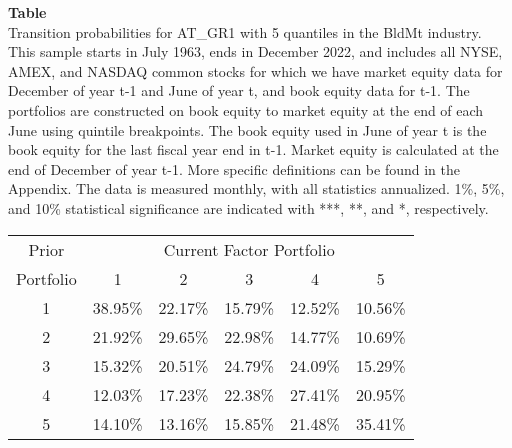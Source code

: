 \begin{table*}[ht!]
\raggedright
{}
\label{tab: transition_probs_AT_GR1_BldMt_with_5_quantiles}
\textbf{Table \thetable} \\
Transition probabilities for AT_GR1 with 5 quantiles in the BldMt industry. \\
\hspace*{1em}This sample starts in July 1963, ends in December 2022, and includes all NYSE, AMEX, and NASDAQ common stocks for which we have market equity data for December of year t-1 and June of year t, and book equity data for t-1. The portfolios are constructed on book equity to market equity at the end of each June using quintile breakpoints.  The book equity used in June of year t is the book equity for the last fiscal year end in t-1.  Market equity is calculated at the end of December of year t-1.  More specific definitions can be found in the Appendix.  The data is measured monthly, with all statistics annualized.  1\%, 5\%, and 10\% statistical significance are indicated with ***, **, and *, respectively. \\
\vspace{0.5em}
\centering
\begin{adjustbox}{max width=\textwidth}
\begin{tabular}{@{}cccccc@{}}
\toprule
Prior & \multicolumn{5}{c}{Current Factor Portfolio} \\
Portfolio & 1 & 2 & 3 & 4 & 5 \\
\midrule
1 & 38.95\% & 22.17\% & 15.79\% & 12.52\% & 10.56\% \\
2 & 21.92\% & 29.65\% & 22.98\% & 14.77\% & 10.69\% \\
3 & 15.32\% & 20.51\% & 24.79\% & 24.09\% & 15.29\% \\
4 & 12.03\% & 17.23\% & 22.38\% & 27.41\% & 20.95\% \\
5 & 14.10\% & 13.16\% & 15.85\% & 21.48\% & 35.41\% \\
\bottomrule
\end{tabular}
\end{adjustbox}
\end{table*}